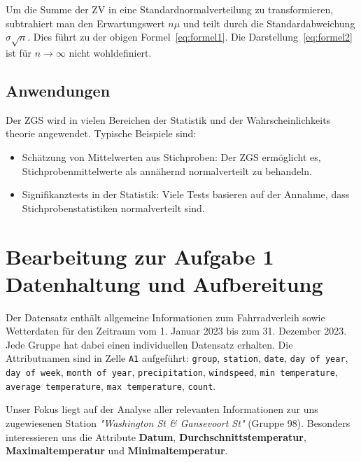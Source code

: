 \documentclass{article}
\begin{document}
Um die Summe der ZV in eine Standardnormalverteilung zu transformieren, subtrahiert man den Erwartungswert \( n\mu \) und teilt durch die Standardabweichung \( \sigma\sqrt{n} \). Dies führt zu der obigen Formel~\eqref{eq:formel1}. Die Darstellung~\eqref{eq:formel2} ist für \( n \to \infty \) nicht wohldefiniert.

\subsection{Anwendungen}
Der ZGS wird in vielen Bereichen der Statistik und der Wahrscheinlichkeits theorie angewendet. Typische Beispiele sind: 
\begin{itemize}
    \item Schätzung von Mittelwerten aus Stichproben: Der ZGS ermöglicht es, Stichprobenmittelwerte als annähernd normalverteilt zu behandeln.
    \item Signifikanztests in der Statistik: Viele Tests basieren auf der Annahme, dass Stichprobenstatistiken normalverteilt sind.
\end{itemize}













\section{Bearbeitung zur Aufgabe 1\\Datenhaltung und Aufbereitung\\}

Der Datensatz enthält allgemeine Informationen zum Fahrradverleih sowie Wetterdaten für den Zeitraum vom 1. Januar 2023 bis zum 31. Dezember 2023. Jede Gruppe hat dabei einen individuellen Datensatz erhalten. Die Attributnamen sind in Zelle \texttt{A1} aufgeführt: \texttt{group}, \texttt{station}, \texttt{date}, \texttt{day of year}, \texttt{day of week}, \texttt{month of year}, \texttt{precipitation}, \texttt{windspeed}, \texttt{min temperature}, \texttt{average temperature}, \texttt{max temperature}, \texttt{count}.

Unser Fokus liegt auf der Analyse aller relevanten Informationen zur uns zugewiesenen Station \emph{"Washington St \& Gansevoort St"} (Gruppe 98). Besonders interessieren uns die Attribute \textbf{Datum}, \textbf{Durchschnittstemperatur}, \textbf{Maximaltemperatur} und \textbf{Minimaltemperatur}.
\end{document}
